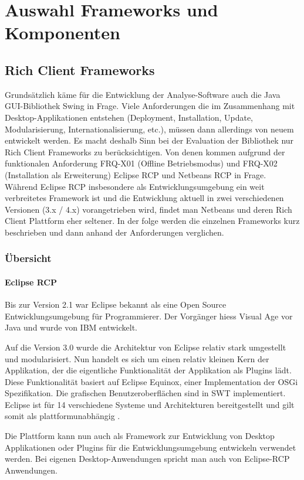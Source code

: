 \chapter{Auswahl Frameworks und Komponenten}\label{selection_rcp_fw}
\section{Rich Client Frameworks}
Grundsätzlich käme für die Entwicklung der Analyse-Software auch die Java GUI-Bibliothek Swing in Frage. Viele Anforderungen die im Zusammenhang mit Desktop-Applikationen entstehen (Deployment, Installation, Update, Modularisierung, Internationalisierung, etc.), müssen dann allerdings von neuem entwickelt werden. Es macht deshalb Sinn bei der Evaluation der Bibliothek nur Rich Client Frameworks zu berücksichtigen. Von denen kommen aufgrund der funktionalen Anforderung FRQ-X01 (Offline Betriebsmodus) und FRQ-X02 (Installation als Erweiterung) Eclipse RCP und Netbeans RCP in Frage. Während Eclipse RCP insbesondere als Entwicklungsumgebung ein weit verbreitetes Framework ist und die Entwicklung aktuell in zwei verschiedenen Versionen (3.x / 4.x) vorangetrieben wird, findet man Netbeans und deren Rich Client Plattform eher seltener. In der folge werden die einzelnen Frameworks kurz beschrieben und dann anhand der Anforderungen verglichen.


\subsection{Übersicht}
\subsubsection{Eclipse RCP}
Bis zur Version 2.1 war Eclipse bekannt als eine Open Source Entwicklungsumgebung für Programmierer. Der Vorgänger hiess Visual Age vor Java und wurde von IBM entwickelt. 

Auf die Version 3.0 wurde die Architektur von Eclipse relativ stark umgestellt und modularisiert. Nun handelt es sich um einen relativ kleinen Kern der Applikation, der die eigentliche Funktionalität der Applikation als Plugins lädt. Diese Funktionalität basiert auf Eclipse Equinox, einer Implementation der OSGi Spezifikation. Die grafischen Benutzeroberflächen sind in SWT implementiert. Eclipse ist für 14 verschiedene Systeme und Architekturen bereitgestellt und gilt somit als plattformunabhängig \cite{wiki:eclipse}. 

Die Plattform kann nun auch als Framework zur Entwicklung von Desktop Applikationen oder Plugins für die Entwicklungsumgebung entwickeln verwendet werden. Bei eigenen Desktop-Anwendungen spricht man auch von Eclipse-RCP Anwendungen.



